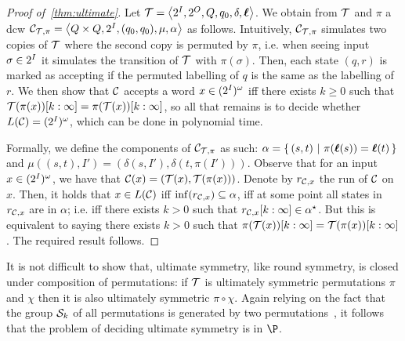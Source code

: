 \begin{proof}[Proof of~\cref{thm:ultimate}]
Let $\mathcal{T}=\left< 2^{I},2^{O},Q,q_0,\delta,\boldsymbol{\ell}\right>$. We obtain from $\mathcal{T}$ and $\pi$ a \gls{dcw} $\mathcal{C}_{\mathcal{T},\pi}=\left< Q\times Q,2^{I},(q_0, q_0),\mu,\alpha\right>$ as follows. Intuitively, $\mathcal{C}_{\mathcal{T},\pi}$ simulates two copies of $\mathcal{T}$ where the second copy is permuted by $\pi$, i.e. when seeing input $\sigma\in 2^{I}$ it simulates the transition of $\mathcal{T}$ with $\pi(\sigma)$. Then, each state $(q,r)$ is marked as accepting if the permuted labelling of $q$ is the same as the labelling of $r$.
We then show that $\mathcal{C}$ accepts a word $x\in (2^{I})^\omega$ iff there exists $k\ge 0$ such that $\mathcal{T}(\pi(x))[k:\infty] = \pi(\mathcal{T}(x))[k:\infty]$, so all that remains is to decide whether $L(\mathcal{C})=(2^{I})^\omega$, which can be done in polynomial time.

Formally, we define the components of $\mathcal{C}_{\mathcal{T}, \pi}$ as such: $\alpha=\left\{\,(s,t)\ \middle|\ \pi(\boldsymbol{\ell}(s))=\boldsymbol{\ell}(t)\,\right\}$ and $\mu\left((s,t),I'\right)=\left( \delta(s,I'), \delta(t, \pi(I')) \right)$. Observe that for an input $x\in (2^{I})^\omega$,
we have that $\mathcal{C}(x)=\left(\mathcal{T}(x), \mathcal{T}(\pi(x))\right)$.
Denote by $r_{\mathcal{C},x}$ the run of $\mathcal{C}$ on $x$. Then, it holds that $x\in L(\mathcal{C})$ iff $\inf(r_{\mathcal{C},x})\subseteq \alpha$, iff at some point all states in $r_{\mathcal{C},x}$ are in $\alpha$; i.e. iff there exists $k>0$ such that $r_{\mathcal{C},x}[k:\infty]\in \alpha^\star$. But this is equivalent to saying there exists $k>0$ such that $\pi(\mathcal{T}(x))[k:\infty] = \mathcal{T}(\pi(x))[k:\infty]$. The required result follows.
\end{proof}

It is not difficult to show that, ultimate symmetry, like round symmetry, is closed under composition of permutations: if $\mathcal{T}$ is ultimately symmetric \WRT permutations $\pi$ and $\chi$ then it is also ultimately symmetric \WRT $\pi\circ\chi$. Again relying on the fact that the group $\mathcal{S}_k$ of all permutations is generated by two permutations~\cite{Cameron1999}, it follows that the problem of deciding ultimate symmetry is in $\P$.
